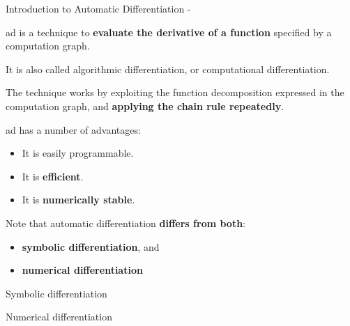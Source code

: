 %
%

\begin{frame}[t,allowframebreaks]{Introduction to Automatic Differentiation -} 

  \gls{ad} 
  is a technique to {\bf evaluate the derivative
  of a function} specified by a 
  \gls{computation graph}.\\
  \vspace{0.2cm}

  It is also called
  \gls{algorithmic differentiation}, or
  \gls{computational differentiation}.\\
  \vspace{0.2cm}

  The technique works by exploiting the function decomposition expressed in the
  computation graph, and {\bf applying the chain rule repeatedly}.\\
  \vspace{0.2cm}
  
  \gls{ad} has a number of advantages:
  \begin{itemize}
    \item It is easily programmable.
    \item It is {\bf efficient}.
    \item It is {\bf numerically stable}.
  \end{itemize}
  
  \framebreak
  
  Note that automatic differentiation {\bf differs from both}:
  \begin{itemize}
    \item {\bf symbolic differentiation}, and
    \item {\bf numerical differentiation}
  \end{itemize}
  
  \begin{blockexample}{Symbolic differentiation}
  \end{blockexample}

  \begin{blockexample}{Numerical differentiation}
  \end{blockexample}

\end{frame}

%
%

